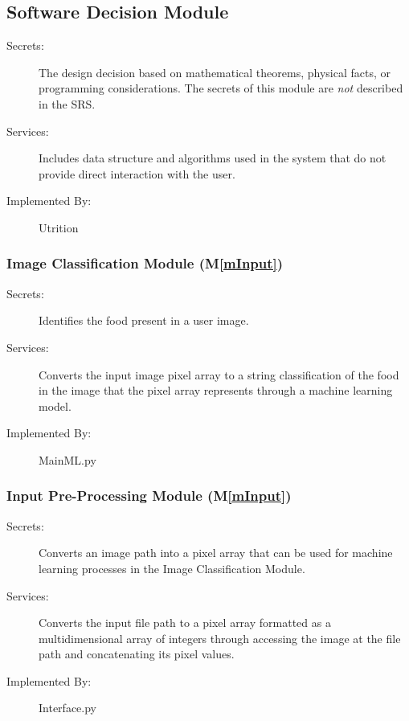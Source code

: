 \documentclass[12pt, titlepage]{article}
\newcommand{\mref}[1]{M\ref{#1}}
\begin{document}
\subsection{Software Decision Module}

\begin{description}
\item[Secrets:] The design decision based on mathematical theorems, physical
  facts, or programming considerations. The secrets of this module are
  \emph{not} described in the SRS.
\item[Services:] Includes data structure and algorithms used in the system that
  do not provide direct interaction with the user. 
\item[Implemented By:] Utrition
\end{description}

\subsubsection{Image Classification Module (\mref{mInput})}

\begin{description}
\item[Secrets:] Identifies the food present in a user image.
\item[Services:]Converts the input image pixel array to a string classification 
of the food in the image that the pixel array represents through a machine 
learning model.
\item[Implemented By:] MainML.py
\end{description}

\subsubsection{Input Pre-Processing Module (\mref{mInput})}

\begin{description}
\item[Secrets:] Converts an image path into a pixel array that can be used for machine learning processes in the Image Classification Module.
\item[Services:] Converts the input file path to a pixel array formatted as a multidimensional array of integers through accessing the image at the file path and concatenating its pixel values.
\item[Implemented By:] Interface.py
\end{description}
\end{document}

